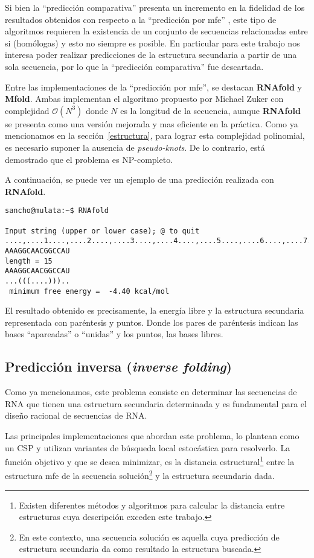 Si bien la ``predicci\'on comparativa'' presenta un incremento en la fidelidad
de los resultados obtenidos con respecto a la ``predicci\'on por \ac{mfe}''
\cite{Gardner04}, este tipo de algoritmos requieren la existencia de un conjunto
de secuencias relacionadas entre si (hom\'ologas) y esto no siempre es posible.
En particular para este trabajo nos interesa poder realizar predicciones de la
estructura secundaria a partir de una sola secuencia, por lo que la
``predicci\'on comparativa'' fue descartada.

Entre las implementaciones de la ``predicci\'on por \ac{mfe}'', se destacan
\textbf{RNAfold}\cite{Hofacker94} y \textbf{Mfold}\cite{Zuker81}. Ambas
implementan el algoritmo propuesto por Michael Zuker con complejidad
$\mathcal{O}(N^{3})$ donde $N$ es la longitud de la secuencia, aunque
\textbf{RNAfold} se presenta como una versi\'on mejorada y mas eficiente en la
pr\'actica. Como ya mencionamos en la secci\'on~\ref{estructura}, para lograr
esta complejidad polinomial, es necesario suponer la ausencia de
\textit{pseudo-knots}. De lo contrario, est\'a demostrado que el problema es
NP-completo\cite{Lyngso00}.

A continuaci\'on, se puede ver un ejemplo de una predicci\'on realizada con
\textbf{RNAfold}.

\begin{verbatim}
sancho@mulata:~$ RNAfold

Input string (upper or lower case); @ to quit
....,....1....,....2....,....3....,....4....,....5....,....6....,....7....,....8
AAAGGCAACGGCCAU
length = 15
AAAGGCAACGGCCAU
...(((....)))..
 minimum free energy =  -4.40 kcal/mol
\end{verbatim}

El resultado obtenido es precisamente, la energ\'ia libre y la estructura
secundaria representada con par\'entesis y puntos. Donde los pares de
par\'entesis indican las bases ``apareadas'' o ``unidas'' y los puntos, las
bases libres.

\subsection{Predicci\'on inversa (\textit{inverse folding})}
\label{inverse}
Como ya mencionamos, este problema consiste en determinar las secuencias de
\ac{RNA} que tienen una estructura secundaria determinada y es fundamental
para el dise\~no racional de secuencias de \ac{RNA}.

Las principales implementaciones que abordan este problema, lo plantean como un
\ac{CSP} y utilizan variantes de b\'usqueda local estoc\'astica para
resolverlo. La funci\'on objetivo y que se desea minimizar, es la distancia
estructural\footnote{Existen diferentes m\'etodos y algoritmos para calcular
la distancia entre estructuras cuya descripci\'on exceden este trabajo.}
entre la estructura \ac{mfe} de la secuencia soluci\'on\footnote{En este
contexto, una secuencia soluci\'on es aquella cuya predicci\'on de estructura
secundaria da como resultado la estructura buscada.} y la estructura secundaria
dada. 

